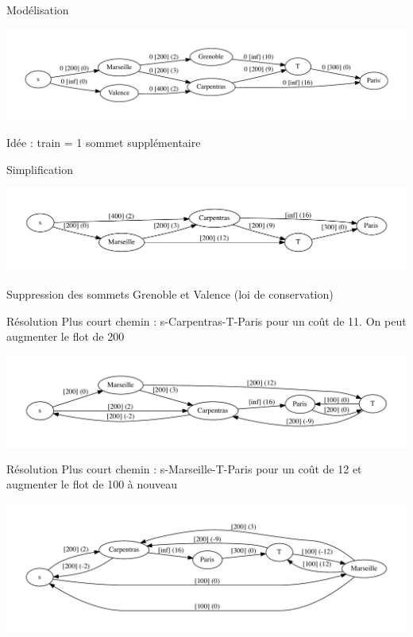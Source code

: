 \begin{frame}{Modélisation}
    \begin{center}
        \includegraphics[width=\textwidth]{tutorials/flmcmin/fleurs-1.pdf}
    \end{center}
    Idée : train = 1 sommet supplémentaire
\end{frame}

\begin{frame}{Simplification}
    \begin{center}
        \includegraphics[width=\textwidth]{tutorials/flmcmin/fleurs-2.pdf}
    \end{center}
    Suppression des sommets Grenoble et Valence (loi de conservation)
\end{frame}



\begin{frame}{Résolution}
    Plus court chemin : s-Carpentras-T-Paris pour un coût de 11. On peut augmenter le flot de 200
    \begin{center}
        \includegraphics[width=\textwidth]{tutorials/flmcmin/fleurs-3.pdf}
    \end{center}
\end{frame}

\begin{frame}{Résolution}
    Plus court chemin : s-Marseille-T-Paris pour un coût de 12 et augmenter le flot de 100 à nouveau
    \begin{center}
        \includegraphics[width=\textwidth]{tutorials/flmcmin/fleurs-4.pdf}
    \end{center}
\end{frame}

